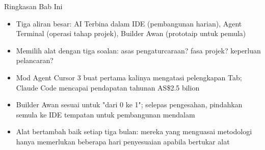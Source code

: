 \begin{tcbsummary}{Ringkasan Bab Ini}
\begin{itemize}
  \item Tiga aliran besar: AI Terbina dalam IDE (pembangunan harian), Agent Terminal (operasi tahap projek), Builder Awan (prototaip untuk pemula)
  \item Memilih alat dengan tiga soalan: asas pengaturcaraan? fasa projek? keperluan pelancaran?
  \item Mod Agent Cursor 3 buat pertama kalinya mengatasi pelengkapan Tab; Claude Code mencapai pendapatan tahunan AS\$2.5 bilion
  \item Builder Awan sesuai untuk "dari 0 ke 1"; selepas pengesahan, pindahkan semula ke IDE tempatan untuk pembangunan mendalam
  \item Alat bertambah baik setiap tiga bulan: mereka yang menguasai metodologi hanya memerlukan beberapa hari penyesuaian apabila bertukar alat
\end{itemize}

\end{tcbsummary}
